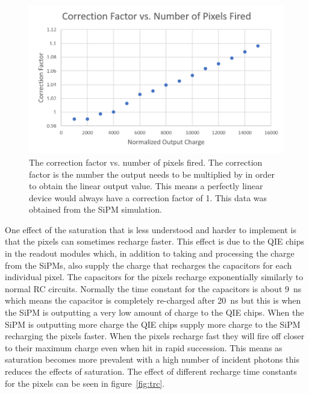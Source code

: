 \begin{figure}
\centering
\includegraphics[width=\linewidth]{Figures/CorFac.png}
\caption{The correction factor vs. number of pixels fired. The correction factor is the number the output needs to be multiplied by in order to obtain the linear output value. This means a perfectly linear device would always have a correction factor of 1. This data was obtained from the SiPM simulation.}
\label{fig:Cor}
\end{figure}

One effect of the saturation that is less understood and harder to implement is that the pixels can sometimes recharge faster. This effect is due to the QIE chips in the readout modules which, in addition to taking and processing the charge from the SiPMs, also supply the charge that recharges the capacitors for each individual pixel. The capacitors for the pixels recharge exponentially similarly to normal RC circuits. Normally the time constant for the capacitors is about 9~ns which means the capacitor is completely re-charged after 20~ns but this is when the SiPM is outputting a very low amount of charge to the QIE chips. When the SiPM is outputting more charge the QIE chips supply more charge to the SiPM recharging the pixels faster. When the pixels recharge fast they will fire off closer to their maximum charge even when hit in rapid succession. This means as saturation becomes more prevalent with a high number of incident photons this reduces the effects of saturation. The effect of different recharge time constants for the pixels can be seen in figure~\ref{fig:trc}.

